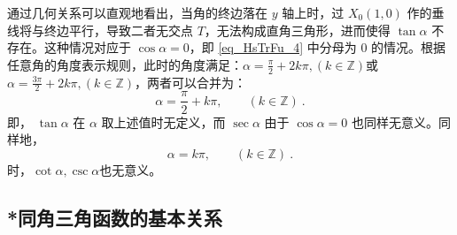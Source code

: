 通过几何关系可以直观地看出，当角的终边落在 $y$ 轴上时，过 $X_0(1,0)$ 作的垂线将与终边平行，导致二者无交点 $T$，无法构成直角三角形，进而使得 $\tan\alpha$ 不存在。这种情况对应于 $\cos\alpha = 0$，即 \autoref{eq_HsTrFu_4} 中分母为 $0$ 的情况。根据任意角的角度表示规则，此时的角度满足：$\displaystyle\alpha=\frac{\pi}{2}+2k\pi,(k\in\mathbb{Z})$或$\displaystyle\alpha=\frac{3\pi}{2}+2k\pi,(k\in\mathbb{Z})$，两者可以合并为：
\begin{equation}\label{eq_HsTrFu_13}
\alpha=\frac{\pi}{2}+k\pi,\qquad(k\in\mathbb{Z})~.
\end{equation}
即， $\tan\alpha$ 在 $\alpha$ 取上述值时无定义，而 $\sec\alpha$ 由于 $\cos\alpha = 0$ 也同样无意义。同样地，
\begin{equation}
\alpha=k\pi,\qquad(k\in\mathbb{Z})~.
\end{equation}
时，$\cot\alpha,\csc\alpha$也无意义。

\subsection{*同角三角函数的基本关系}


